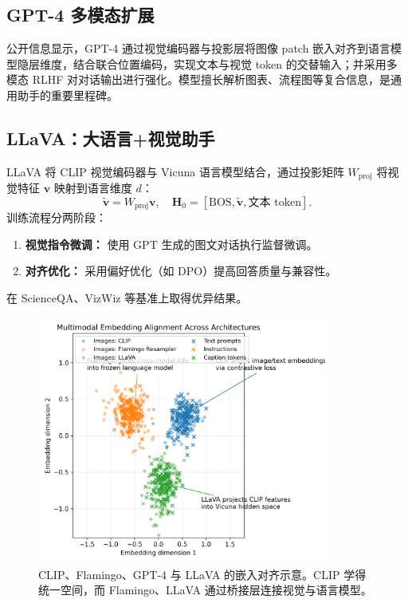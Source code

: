 \documentclass[UTF8,zihao=-4]{ctexart}
\begin{document}
\subsection{GPT-4 多模态扩展}
公开信息显示，GPT-4 通过视觉编码器与投影层将图像 patch 嵌入对齐到语言模型隐层维度，结合联合位置编码，实现文本与视觉 token 的交替输入；并采用多模态 RLHF 对对话输出进行强化。模型擅长解析图表、流程图等复合信息，是通用助手的重要里程碑。

\subsection{LLaVA：大语言+视觉助手}
LLaVA 将 CLIP 视觉编码器与 Vicuna 语言模型结合，通过投影矩阵 $W_{\text{proj}}$ 将视觉特征 $\mathbf{v}$ 映射到语言维度 $d$：
\begin{equation}
  \tilde{\mathbf{v}} = W_{\text{proj}} \mathbf{v}, \quad \mathbf{H}_0 = [\text{BOS}, \tilde{\mathbf{v}}, \text{文本 token}].
\end{equation}
训练流程分两阶段：
\begin{enumerate}
  \item \textbf{视觉指令微调：} 使用 GPT 生成的图文对话执行监督微调。
  \item \textbf{对齐优化：} 采用偏好优化（如 DPO）提高回答质量与兼容性。
\end{enumerate}
在 ScienceQA、VizWiz 等基准上取得优异结果。

\begin{figure}[H]
  \centering
  \includegraphics[width=0.85\textwidth]{clip_multimodal_alignment.png}
  \caption{CLIP、Flamingo、GPT-4 与 LLaVA 的嵌入对齐示意。CLIP 学得统一空间，而 Flamingo、LLaVA 通过桥接层连接视觉与语言模型。}
  \label{fig:clip_multimodal_alignment_cn}
\end{figure}
\FloatBarrier
\end{document}
